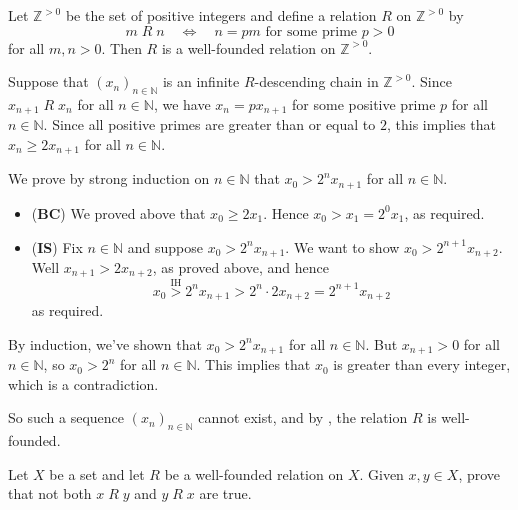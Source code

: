 \begin{proposition}
\label{propPositiveIntegersAsWellFoundedSet}
Let $\mathbb{Z}^{>0}$ be the set of positive integers and define a relation $R$ on $\mathbb{Z}^{>0}$ by
\[ m\; R\; n \quad \Leftrightarrow \quad n=pm \text{ for some prime } p>0 \]
for all $m,n > 0$. Then $R$ is a well-founded relation on $\mathbb{Z}^{>0}$.
\end{proposition}
\begin{cproof}
Suppose that $(x_n)_{n \in \mathbb{N}}$ is an infinite $R$-descending chain in $\mathbb{Z}^{>0}$. Since $x_{n+1}\;R\;x_n$ for all $n \in \mathbb{N}$, we have $x_n = px_{n+1}$ for some positive prime $p$ for all $n \in \mathbb{N}$. Since all positive primes are greater than or equal to $2$, this implies that $x_n \ge 2x_{n+1}$ for all $n \in \mathbb{N}$.

We prove by strong induction on $n \in \mathbb{N}$ that $x_0 > 2^nx_{n+1}$ for all $n \in \mathbb{N}$.

\begin{itemize}
\item (\textbf{BC}) We proved above that $x_0 \ge 2x_1$. Hence $x_0 > x_1 = 2^0x_1$, as required.
\item (\textbf{IS}) Fix $n \in \mathbb{N}$ and suppose $x_0 > 2^nx_{n+1}$. We want to show $x_0 > 2^{n+1}x_{n+2}$. Well $x_{n+1} > 2x_{n+2}$, as proved above, and hence
\[ x_0 \overset{\text{IH}}{>} 2^nx_{n+1} > 2^n \cdot 2x_{n+2} = 2^{n+1}x_{n+2} \]
as required.
\end{itemize}

By induction, we've shown that $x_0 > 2^nx_{n+1}$ for all $n \in \mathbb{N}$. But $x_{n+1} > 0$ for all $n \in \mathbb{N}$, so $x_0 > 2^n$ for all $n \in \mathbb{N}$. This implies that $x_0$ is greater than every integer, which is a contradiction.

So such a sequence $(x_n)_{n \in \mathbb{N}}$ cannot exist, and by , the relation $R$ is well-founded.
\end{cproof}

\begin{exercise}
\label{exWellFoundedRelationsAreAsymmetric}
Let $X$ be a set and let $R$ be a well-founded relation on $X$. Given $x,y \in X$, prove that not both $x\; R\; y$ and $y\; R\; x$ are true.
\end{exercise}

